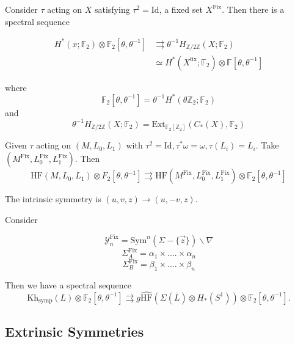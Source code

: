 \begin{example}

Consider $\tau$ acting on $X$ satisfying $\tau^2 = \text{Id}$, a fixed set $X^{\text{Fix}}$. Then there is a spectral sequence

\begin{align*}
H^*(x; \mathbb{F}_2)\otimes \mathbb{F}_2 \left[\theta, \theta^{-1}\right] &\rightrightarrows \theta^{-1} H_{\mathbb{Z}/2\mathbb{Z}}(X; \mathbb{F}_2) \\
& \simeq H^* (X^{\text{fix}}; \mathbb{F}_2)\otimes \mathbb{F}\left[\theta, \theta^{-1}\right]
\end{align*}

where
\[\mathbb{F}_2\left[\theta, \theta^{-1}\right] = \theta^{-1}H^*(\theta \mathbb{Z}_2; \mathbb{F}_2)
\]
and
\[
\theta^{-1} H_{\mathbb{Z}/2\mathbb{Z}}(X; \mathbb{F}_2) = \text{Ext}_{\mathbb{F}_2\left[\mathbb{Z}_2 \right]}(C_*(X), \mathbb{F}_2)
\]

\end{example}

\begin{example}

Given $\tau$ acting on $(M,L_0, L_1)$ with $\tau^2 = \text{Id}, \tau^*\omega = \omega, \tau(L_i)=L_i$. Take $(M^{\text{Fix}},L_0^{\text{Fix}}, L_1^{\text{Fix}})$. Then
\[
\text{HF}(M, L_0, L_1)\otimes F_2[\theta, \theta^{-1}]\rightrightarrows \text{HF}(M^{\text{Fix}},L_0^{\text{Fix}}, L_1^{\text{Fix}})\otimes \mathbb{F}_2 [\theta, \theta^{-1}]
\]

\end{example}

The intrinsic symmetry is $(u,v,z)\to (u, -v,z)$.

\begin{theorem}
[Manelescu]

Consider

\[
\mathcal{Y}_n^{\text{Fix}}=\text{Sym}^n(\Sigma-\{ \vec{z} \})\backslash \nabla
\]
\[
\Sigma_A^{\text{Fix}}=\alpha_1\times ....\times \alpha_n
\]
\[
\Sigma_B^{\text{Fix}}=\beta_1\times ....\times \beta_n
\]

Then we have a spectral sequence
\[
\text{Kh}_{\text{symp}}(L)\otimes \mathbb{F}_2[\theta, \theta^{-1}]\rightrightarrows g\widehat{\text{HF}}(\Sigma (\overline{L})\otimes H_*(S^1))\otimes \mathbb{F}_2[\theta, \theta^{-1}].
\]

\end{theorem}

\subsection{Extrinsic Symmetries }

